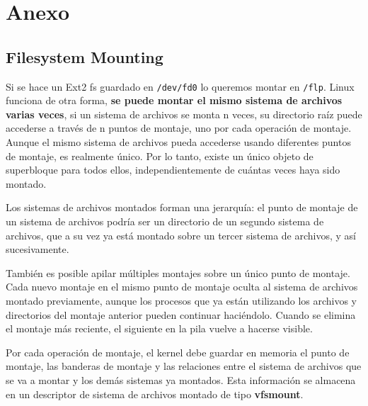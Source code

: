 \documentclass[openany]{book}
\begin{document}
\newpage
\chapter{Anexo}
\section{Filesystem Mounting}

Si se hace  un Ext2 fs guardado en \texttt{/dev/fd0} lo queremos montar en \texttt{/flp}. Linux funciona de otra forma, \textbf{se puede montar el mismo sistema de archivos varias veces}, si un sistema de archivos se monta n veces, su directorio raíz puede accederse a través de n puntos de montaje, uno por cada operación de montaje. Aunque el mismo sistema de archivos pueda accederse usando diferentes puntos de montaje, es realmente único. Por lo tanto, existe un único objeto de superbloque para todos ellos, independientemente de cuántas veces haya sido montado.

Los sistemas de archivos montados forman una jerarquía: el punto de montaje de un sistema de archivos podría ser un directorio de un segundo sistema de archivos, que a su vez ya está montado sobre un tercer sistema de archivos, y así sucesivamente.

También es posible apilar múltiples montajes sobre un único punto de montaje. Cada nuevo montaje en el mismo punto de montaje oculta al sistema de archivos montado previamente, aunque los procesos que ya están utilizando los archivos y directorios del montaje anterior pueden continuar haciéndolo. Cuando se elimina el montaje más reciente, el siguiente en la pila vuelve a hacerse visible.

Por cada operación de montaje, el kernel debe guardar en memoria el punto de montaje, las banderas de montaje y las relaciones entre el sistema de archivos que se va a montar y los demás sistemas ya montados. Esta información se almacena en un descriptor de sistema de archivos montado de tipo \textbf{vfsmount}. 
\end{document}
